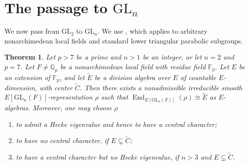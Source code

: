 \documentclass[a4paper,10pt,twoside]{amsart}
\DeclareMathOperator{\End}{End}
\newtheorem{theorem}{Theorem}[section]
\theoremstyle{definition}
\numberwithin{equation}{section}
\begin{document}
\section{The passage to \texorpdfstring{\(\mathrm{GL}_n\)}{GLn}}

We now pass from \(\mathrm{GL}_2\) to \(\mathrm{GL}_n\). We use
\cite[Proposition~3.3]{Le24}, which applies to arbitrary nonarchimedean local
fields and standard lower triangular parabolic subgroups.

\begin{theorem}\label{GLn theorem}
Let \(p>7\) be a prime and \(n>1\) be an integer, or let \(n=2\) and \(p=7\). Let \(F\neq\mathbb Q_p\) be a
nonarchimedean local field with residue field \(\mathbb F_p\). Let \(E\) be
an extension of \(\mathbb F_p\), and let \(\widetilde E\) be a division
algebra over \(E\) of countable \(E\)-dimension, with center
\(\widetilde C\). Then there exists a nonadmissible irreducible smooth
\(E[\mathrm{GL}_n(F)]\)-representation \(\rho\) such that \(\End_{E[\mathrm{GL}_n(F)]}(\rho)\cong \widetilde E
\) as \(E\)-algebras. Moreover, one may choose \(\rho\)
\begin{enumerate}
\item to admit a Hecke eigenvalue and hence to have a central character;
\item to have no central character, if \(E\subsetneq\widetilde C\);
\item to have a central character but no Hecke eigenvalue, if
\(n>3\) and \(E\subsetneq\widetilde C\).
\end{enumerate}
\end{theorem}
\end{document}
